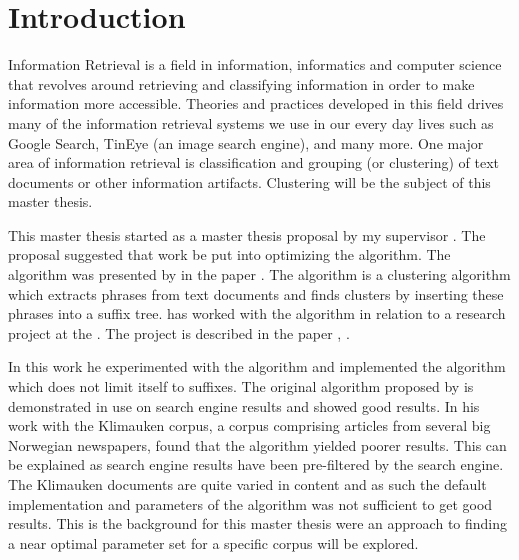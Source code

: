
\chapter{Introduction} %

\label{Introduction}



Information Retrieval is a field in information, informatics and computer science that revolves around retrieving and classifying information in order to make information more accessible. Theories and practices developed in this field drives many of the information retrieval systems we use in our every day lives such as Google Search, TinEye (an image search engine), and many more. One major area of information retrieval is classification and grouping (or clustering) of text documents or other information artifacts. Clustering will be the subject of this master thesis.

This master thesis started as a master thesis proposal by my supervisor \supervisor. The proposal suggested that work be put into optimizing the \STC algorithm. The \STC algorithm was presented by \textcite{Oren1998} in the paper . The algorithm is a clustering algorithm which extracts phrases from text documents and finds clusters by inserting these phrases into a suffix tree. \supervisor has worked with the \STC algorithm in relation to a research project at the \deptname. The project is described in the paper , \parencite{Elgesem2009}.

In this work he experimented with the \STC algorithm and implemented the \CTC algorithm which does not limit itself to suffixes. The original \STC algorithm proposed by \textcite{Oren1998} is demonstrated in use on search engine results and showed good results. In his work with the Klimauken corpus, a corpus comprising articles from several big Norwegian newspapers, \supervisor found that the \STC algorithm yielded poorer results. This can be explained as search engine results have been pre-filtered by the search engine. The Klimauken documents are quite varied in content and as such the default implementation and parameters of the \STC algorithm was not sufficient to get good results. This is the background for this master thesis were an approach to finding a near optimal parameter set for a specific corpus will be explored.

